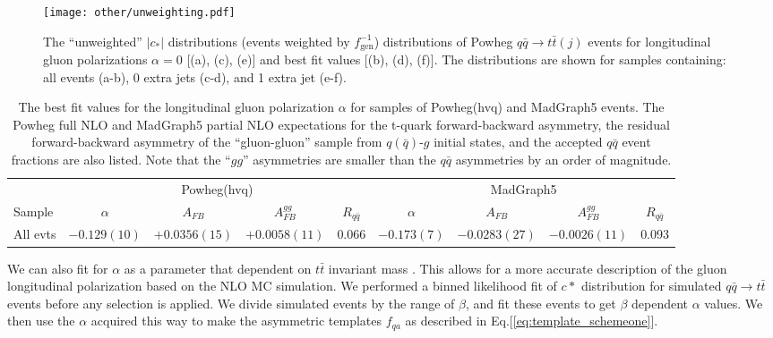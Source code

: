 \documentclass{cmspaperpdf}
\begin{document}
 \begin{figure}[hbt]
  \begin{center}
    \texttt{[image: other/unweighting.pdf]}
  \caption{\small The ``unweighted'' $|c_*|$ distributions (events weighted by $f_\mathrm{gen}^{-1}$) distributions of Powheg $q\bar q\to t\bar t(j)$ events for longitudinal gluon polarizations $\alpha=0$ [(a), (c), (e)] and best fit values [(b), (d), (f)].  The distributions are shown for samples containing: all events (a-b), 0 extra jets (c-d), and 1 extra jet (e-f).}
    \label{fig:unweight_test}
  \end{center}
\end{figure}

\begin{table}[hbt]
\begin{center}
\caption{\small \label{tab:alpha_tune} The best fit values for the longitudinal gluon polarization $\alpha$ for samples of Powheg(hvq) and MadGraph5 events.  The Powheg full NLO and MadGraph5 partial NLO expectations for the t-quark forward-backward asymmetry, the residual forward-backward asymmetry of the ``gluon-gluon'' sample from $q(\bar q)$-$g$ initial states, and the accepted $q\bar q$ event fractions are also listed.  Note that the ``$gg$'' asymmetries are smaller than the $q\bar q$ asymmetries by an order of magnitude.}
\vspace{3pt}
\begin{tabular}{|l|cccc|cccc|}\hline
 & \multicolumn{4}{c}{Powheg(hvq)} &  \multicolumn{4}{|c|}{MadGraph5} \\ 
Sample    & $\alpha$      &  $A_{FB}$      & $A_{FB}^{gg}$ &  $R_{q\bar q}$ &  $\alpha$    &  $A_{FB}$      & $A_{FB}^{gg}$ &  $R_{q\bar q}$ \\ \hline
All evts  & $-0.129(10)$  & $+0.0356(15)$  & $+0.0058(11)$ & 0.066          & $-0.173(7)$  & $-0.0283(27)$  & $-0.0026(11)$ & 0.093          \\ 
\hline
\end{tabular}
\end{center}
\end{table}

We can also fit for $\alpha$ as a parameter that dependent on $t\bar t$ invariant mass \cite{AFB-13Tev-AN}. This allows for a more accurate description of the gluon longitudinal polarization based on the NLO MC simulation. We performed a binned likelihood fit of $c*$ distribution for simulated $q\bar q \rightarrow t \bar t$ events before any selection is applied. We divide simulated events by the range of $\beta$, and fit these events to get $\beta$ dependent $\alpha$ values. We then use the $\alpha$ acquired this way to make the asymmetric templates $f_{qa}$ as described in Eq.[\ref{eq:template_schemeone}]. 
\end{document}
